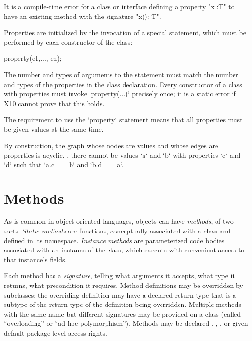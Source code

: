\begin{staticrule*}
It is a compile-time error for a class or
interface defining a property \xcd"x :T" to have an existing method with
the signature \xcd"x(): T".
\end{staticrule*}


Properties are initialized by the invocation of a special 
statement, which must be performed by each constructor of the class:
\begin{xten}
property(e1,..., en);
\end{xten}
The number and types of arguments to the  statement must match
the number and types of the properties in the class declaration.  
Every constructor of a class with properties must invoke \xcd`property(...)`
precisely once; it is a static error if X10 cannot prove that this holds.

The requirement to use the \xcd`property` statement means that all properties
must be given values at the same time.  

By construction, the graph whose nodes are values and whose edges are
properties is acyclic.  \Eg, there cannot be values \xcd`a` and \xcd`b` with
properties \xcd`c` and \xcd`d` such that \xcd`a.c == b` and \xcd`b.d == a`.


\label{PropertyCall}







\section{Methods}

As is common in object-oriented languages, objects can have {\em methods}, of
two sorts.  {\em Static methods} are functions, conceptually associated with a
class and defined in its namespace.  {\em Instance methods} are parameterized
code bodies associated with an instance of the class, which execute with
convenient access to that instance's fields. 

Each method has a {\em signature}, telling what arguments it accepts, what
type it returns, what precondition it requires. Method definitions may be
overridden by subclasses; the overriding definition may have a declared return
type that is a subtype of the return type of the definition being overridden.
Multiple methods with the same name but different signatures may be provided
on a class (called ``overloading'' or ``ad hoc polymorphism''). Methods may be
declared , , , or given default package-level access
rights.



